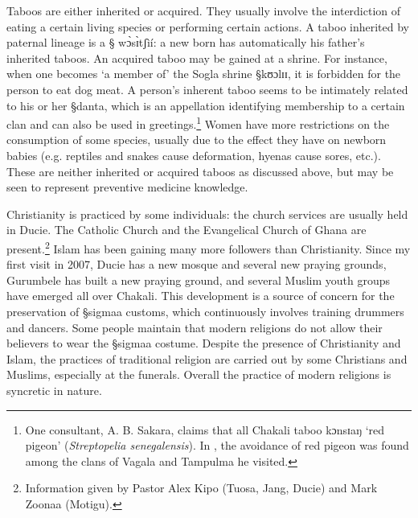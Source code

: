 Taboos are either inherited or acquired. They usually involve the
interdiction of eating a certain living species or performing certain actions. A
taboo   inherited by paternal lineage is a {\S
wɔ̀sɪ̀tʃìí}: a new born has
automatically  his father's inherited taboos. An acquired taboo may be gained at
a shrine. For instance, when one becomes `a member of' the Sogla shrine
{\S kʊɔlɪɪ},  it is forbidden for the person to eat dog meat.  %
 A person’s inherent taboo seems to be intimately
related to
his or her {\S danta}, which is an appellation identifying membership to a
certain
clan and  can also be used in greetings.\footnote{One consultant, A. B. Sakara,
claims 
that all Chakali taboo {\F kɔnsɪaŋ}
`red pigeon'  ({\it Streptopelia
senegalensis}). In \citet[517-520]{Ratt32b},
 the avoidance of red
pigeon was found
among the clans of Vagala and Tampulma he visited.}    Women have more
restrictions on the consumption of some
species, usually due to the effect they have on newborn babies 
(e.g. reptiles and snakes
cause
deformation, hyenas cause sores, etc.). These are neither inherited or acquired
taboos as discussed above,  but may be seen to
represent preventive medicine knowledge.



Christianity is practiced by some individuals: the church services are usually
held in Ducie. The Catholic Church and  the Evangelical Church of Ghana are
present.\footnote{Information given by Pastor Alex Kipo (Tuosa, Jang, Ducie) and
Mark Zoonaa (Motigu).} Islam has been gaining many more followers than 
Christianity. Since my first visit in 2007,  Ducie has a new mosque and several
new praying grounds, Gurumbele has built a new praying ground, and several
Muslim
youth groups have emerged all over Chakali.  This development is a
source of
concern for the preservation of {\S sigmaa} customs,  which  continuously
involves training drummers and dancers. Some people maintain that  modern
religions do not allow their believers to wear the  {\S sigmaa} costume.
Despite the presence of Christianity and
Islam, the practices of   traditional religion are carried out by some
Christians and Muslims, especially at the funerals. Overall the practice of
modern
religions is syncretic in nature. 













